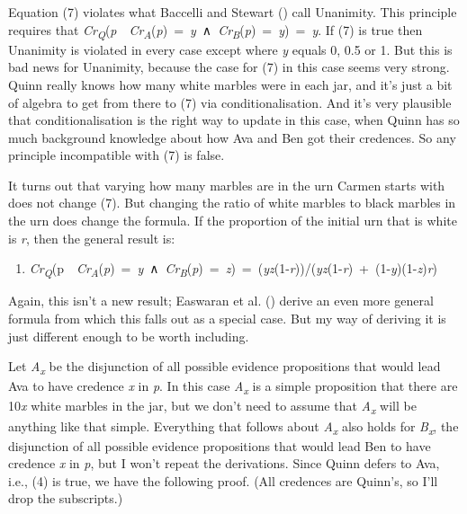 \documentclass[
  11pt,
  letterpaper,
  DIV=11,
  numbers=noendperiod,
  twoside]{scrartcl}
\providecommand{\tightlist}{%
  \setlength{\itemsep}{0pt}\setlength{\parskip}{0pt}}
\begin{document}
Equation (7) violates what Baccelli and Stewart
() call Unanimity. This
principle requires that
\emph{Cr\textsubscript{Q}}(\emph{p}~\textbar~\emph{Cr\textsubscript{A}}(\emph{p})~=~\emph{y}~∧~\emph{Cr\textsubscript{B}}(\emph{p})~=~\emph{y})~=~\emph{y}.
If (7) is true then Unanimity is violated in every case except where
\emph{y} equals 0, 0.5 or 1. But this is bad news for Unanimity, because
the case for (7) in this case seems very strong. Quinn really knows how
many white marbles were in each jar, and it's just a bit of algebra to
get from there to (7) via conditionalisation. And it's very plausible
that conditionalisation is the right way to update in this case, when
Quinn has so much background knowledge about how Ava and Ben got their
credences. So any principle incompatible with (7) is false.

It turns out that varying how many marbles are in the urn Carmen starts
with does not change (7). But changing the ratio of white marbles to
black marbles in the urn does change the formula. If the proportion of
the initial urn that is white is \emph{r}, then the general result is:

\begin{enumerate}
\def\labelenumi{(\arabic{enumi})}
\setcounter{enumi}{7}
\tightlist
\item
  \emph{Cr\textsubscript{Q}}(p~\textbar~\emph{Cr\textsubscript{A}}(\emph{p})~=~\emph{y}~∧~\emph{Cr\textsubscript{B}}(\emph{p})~=~\emph{z})~=~(\emph{yz}(1-\emph{r}))/(\emph{yz}(1-\emph{r})~+~(1-\emph{y})(1-\emph{z})\emph{r})
\end{enumerate}

Again, this isn't a new result; Easwaran et al.
() derive an even more general
formula from which this falls out as a special case. But my way of
deriving it is just different enough to be worth including.

Let \emph{A\textsubscript{x}} be the disjunction of all possible
evidence propositions that would lead Ava to have credence \emph{x} in
\emph{p}. In this case \emph{A\textsubscript{x}} is a simple proposition
that there are 10\emph{x} white marbles in the jar, but we don't need to
assume that \emph{A\textsubscript{x}} will be anything like that simple.
Everything that follows about \emph{A\textsubscript{x}} also holds for
\emph{B\textsubscript{x}}, the disjunction of all possible evidence
propositions that would lead Ben to have credence \emph{x} in \emph{p},
but I won't repeat the derivations. Since Quinn defers to Ava, i.e., (4)
is true, we have the following proof. (All credences are Quinn's, so
I'll drop the subscripts.)
\end{document}

